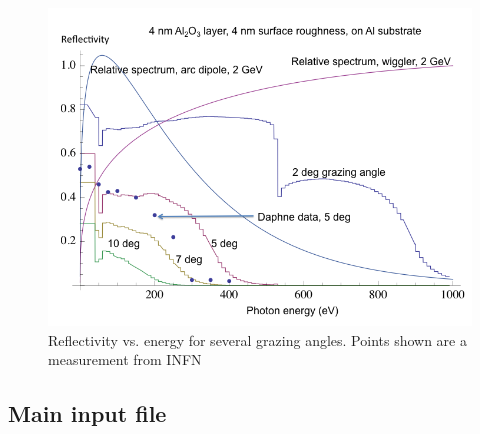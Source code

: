 \documentclass[11pt]{article}
\begin{document}
\begin{figure}[tb]
\begin{center}
\includegraphics[width=5in]{reflectivity_4nm.png}
\caption{Reflectivity vs. energy for several grazing angles. 
Points shown are a measurement from INFN~\cite{b.mehne}}
\label{f:reflect}
\end{center}
\end{figure}

\subsection{Main input file} 
\label{s:main.file}
\end{document}
